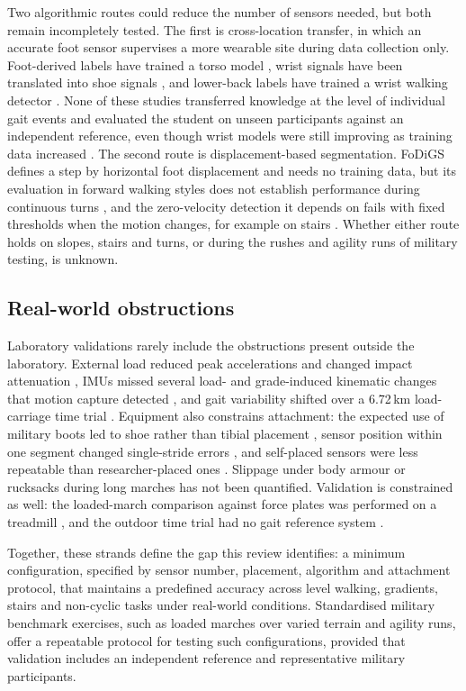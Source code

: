 \documentclass[10pt,a4paper,twocolumn]{article}
\begin{document}
Two algorithmic routes could reduce the number of sensors needed, but both remain incompletely tested. The first is cross-location transfer, in which an accurate foot sensor supervises a more wearable site during data collection only. Foot-derived labels have trained a torso model \citep{koroglu2018}, wrist signals have been translated into shoe signals \citep{kolakowski2024}, and lower-back labels have trained a wrist walking detector \citep{brand2022}. None of these studies transferred knowledge at the level of individual gait events and evaluated the student on unseen participants against an independent reference, even though wrist models were still improving as training data increased \citep{anderson2025}. The second route is displacement-based segmentation. FoDiGS defines a step by horizontal foot displacement and needs no training data, but its evaluation in forward walking styles does not establish performance during continuous turns \citep{ruizruiz2024}, and the zero-velocity detection it depends on fails with fixed thresholds when the motion changes, for example on stairs \citep{wagstaff2020}. Whether either route holds on slopes, stairs and turns, or during the rushes and agility runs of military testing, is unknown.

\subsection{Real-world obstructions}

Laboratory validations rarely include the obstructions present outside the laboratory. External load reduced peak accelerations and changed impact attenuation \citep{fain2024b}, IMUs missed several load- and grade-induced kinematic changes that motion capture detected \citep{fain2024a}, and gait variability shifted over a 6.72\,km load-carriage time trial \citep{feigel2026}. Equipment also constrains attachment: the expected use of military boots led to shoe rather than tibial placement \citep{fain2024b}, sensor position within one segment changed single-stride errors \citep{kuderle2022}, and self-placed sensors were less repeatable than researcher-placed ones \citep{ruder2022}. Slippage under body armour or rucksacks during long marches has not been quantified. Validation is constrained as well: the loaded-march comparison against force plates was performed on a treadmill \citep{slattery2024}, and the outdoor time trial had no gait reference system \citep{feigel2026}.

Together, these strands define the gap this review identifies: a minimum configuration, specified by sensor number, placement, algorithm and attachment protocol, that maintains a predefined accuracy across level walking, gradients, stairs and non-cyclic tasks under real-world conditions. Standardised military benchmark exercises, such as loaded marches over varied terrain and agility runs, offer a repeatable protocol for testing such configurations, provided that validation includes an independent reference and representative military participants.
\end{document}
